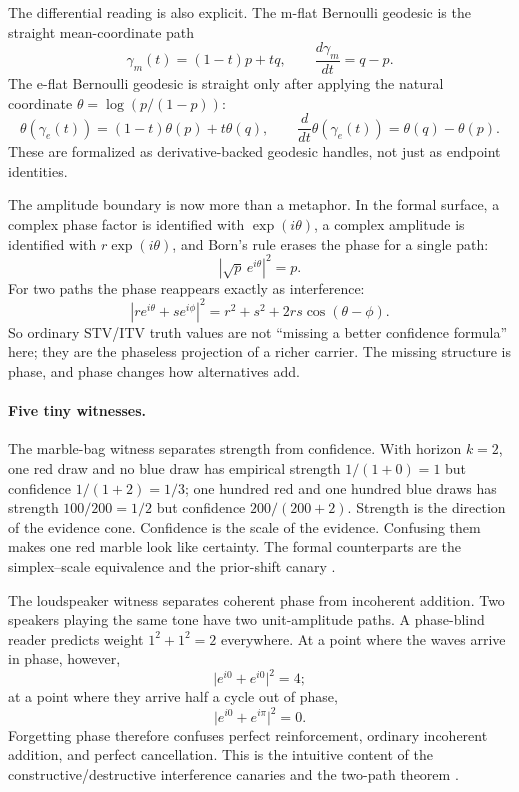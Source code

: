 \documentclass[11pt,openany]{report}
\begin{document}
The differential reading is also explicit.  The m-flat Bernoulli
geodesic is the straight mean-coordinate path
\[
  \gamma_m(t)=(1-t)p+tq,
  \qquad
  \frac{d\gamma_m}{dt}=q-p .
\]
The e-flat Bernoulli geodesic is straight only after applying the
natural coordinate $\theta=\log(p/(1-p))$:
\[
  \theta(\gamma_e(t))=(1-t)\theta(p)+t\theta(q),
  \qquad
  \frac{d}{dt}\theta(\gamma_e(t))=\theta(q)-\theta(p).
\]
These are formalized as derivative-backed geodesic handles, not just
as endpoint identities.

The amplitude boundary is now more than a metaphor.  In the formal
surface, a complex phase factor is identified with $\exp(i\theta)$, a
complex amplitude is identified with $r\exp(i\theta)$, and Born's rule
erases the phase for a single path:
\[
  \left\lvert \sqrt{p}\,e^{i\theta}\right\rvert^2 = p .
\]
For two paths the phase reappears exactly as interference:
\[
  \left\lvert r e^{i\theta} + s e^{i\phi}\right\rvert^2
  = r^2 + s^2 + 2rs\cos(\theta-\phi).
\]
So ordinary STV/ITV truth values are not ``missing a better confidence
formula'' here; they are the phaseless projection of a richer carrier.
The missing structure is phase, and phase changes how alternatives add.

\paragraph{Five tiny witnesses.}
The marble-bag witness separates strength from confidence.  With
horizon $k=2$, one red draw and no blue draw has empirical strength
$1/(1+0)=1$ but confidence $1/(1+2)=1/3$; one hundred red and one
hundred blue draws has strength $100/200=1/2$ but confidence
$200/(200+2)$.  Strength is the direction of the evidence cone.
Confidence is the scale of the evidence.  Confusing them makes one red
marble look like certainty.  The formal counterparts are the
simplex--scale equivalence
 and the prior-shift canary
.

The loudspeaker witness separates coherent phase from incoherent
addition.  Two speakers playing the same tone have two unit-amplitude
paths.  A phase-blind reader predicts weight $1^2+1^2=2$ everywhere.
At a point where the waves arrive in phase, however,
\[
  \lvert e^{i0}+e^{i0}\rvert^2 = 4;
\]
at a point where they arrive half a cycle out of phase,
\[
  \lvert e^{i0}+e^{i\pi}\rvert^2 = 0.
\]
Forgetting phase therefore confuses perfect reinforcement, ordinary
incoherent addition, and perfect cancellation.  This is the intuitive
content of the constructive/destructive interference canaries and the
two-path theorem
.
\end{document}
